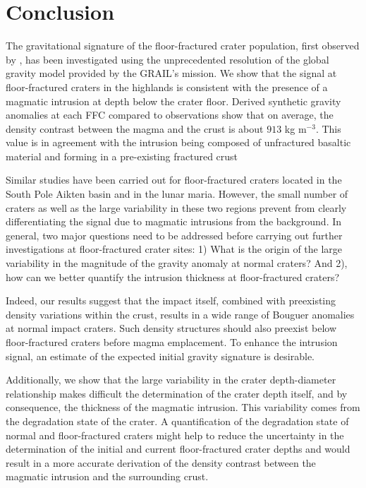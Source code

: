 \section{Conclusion}
\label{C6-sec:conclusion}

The gravitational signature of  the floor-fractured crater population,
first observed by \citet{Schultz:1976kt},  has been investigated using
the unprecedented resolution  of the global gravity  model provided by
the  GRAIL's mission.   We  show that  the  signal at  floor-fractured
craters in the highlands is consistent with the presence of a magmatic
intrusion at depth below the  crater floor.  Derived synthetic gravity
anomalies at each  FFC compared to observations show  that on average,
the density contrast between the magma and the crust is about $913$ kg
m$^{-3}$. This value is in agreement with the intrusion being composed
of  unfractured  basaltic  material  and  forming  in  a  pre-existing
fractured crust \citep{Wieczorek:2013ipa}

Similar  studies have  been  carried out  for floor-fractured  craters
located  in the  South  Pole  Aikten basin  and  in  the lunar  maria.
However, the small number of craters  as well as the large variability
in these two  regions prevent from clearly  differentiating the signal
due to magmatic intrusions from the background.  In general, two major
questions   need  to   be  addressed   before  carrying   out  further
investigations at floor-fractured crater sites:  1) What is the origin
of the  large variability in the  magnitude of the gravity  anomaly at
normal  craters? And  2),  how  can we  better  quantify the  intrusion
thickness at floor-fractured craters?

Indeed,  our results  suggest that  the impact  itself, combined  with
preexisting density  variations within  the crust,  results in  a wide
range of  Bouguer anomalies  at normal  impact craters.   Such density
structures should  also preexist below floor-fractured  craters before
magma emplacement.   To enhance the  intrusion signal, an  estimate of
the expected initial gravity signature is desirable.

Additionally,  we  show  that  the large  variability  in  the  crater
depth-diameter relationship  makes difficult the determination  of the
crater depth itself, and by consequence, the thickness of the magmatic
intrusion.  This variability  comes from the degradation  state of the
crater.   A quantification  of  the degradation  state  of normal  and
floor-fractured craters  might help to  reduce the uncertainty  in the
determination of the initial and current floor-fractured crater depths
and would result in a more accurate derivation of the density contrast
between the magmatic intrusion and the surrounding crust.


